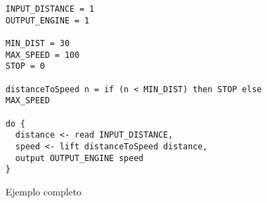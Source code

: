 
\begin{figure}[h!]
\begin{center}
    \caption{Ejemplo completo}
\begin{Verbatim}[frame=single]
INPUT_DISTANCE = 1
OUTPUT_ENGINE = 1

MIN_DIST = 30
MAX_SPEED = 100
STOP = 0

distanceToSpeed n = if (n < MIN_DIST) then STOP else MAX_SPEED

do {
  distance <- read INPUT_DISTANCE,
  speed <- lift distanceToSpeed distance,
  output OUTPUT_ENGINE speed
}
\end{Verbatim}
   \label{fig:example1}
\end{center}
\end{figure}
